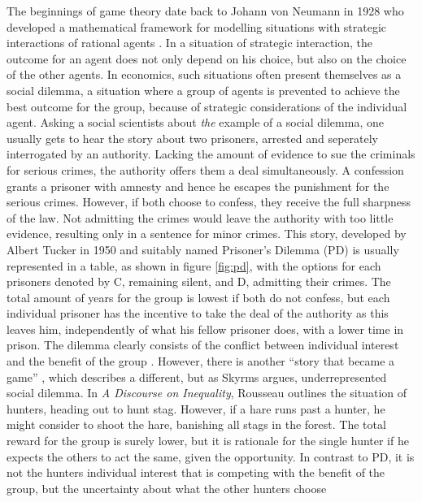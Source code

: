 %
%
%
%

The beginnings of game theory date back to Johann von Neumann in 1928 
who developed a mathematical framework
for modelling situations with strategic interactions of rational agents 
\parencite{v._neumann_zur_1928}.
In a situation of strategic interaction, the outcome for an agent does not
only depend on his choice, but also on the choice of the other agents.
In economics, such situations often present themselves as a social dilemma,
a situation where a group of agents is prevented to achieve the best
outcome for the group, because of strategic considerations of the individual
agent.
Asking a social scientists about \textit{the} example of a social dilemma, 
one usually gets to hear the story about two prisoners, arrested and 
seperately interrogated by an authority. Lacking the amount of evidence to sue 
the criminals for serious crimes, the authority offers them a deal 
simultaneously.
A confession grants a prisoner with amnesty and hence he escapes the punishment
for the serious crimes. However, if both choose to confess, they receive the
full sharpness of the law. Not admitting the crimes would leave the authority
with too little evidence, resulting only in a sentence for minor crimes.
This story, developed by Albert Tucker in 1950 and suitably named Prisoner's
Dilemma (PD) is usually represented in a table, as shown in figure \ref{fig:pd}, with
the options for each prisoners denoted by C, remaining silent, and D, admitting
their crimes. 
The total amount of years for the group is lowest if both do not confess, 
but each individual prisoner has the 
incentive to take the deal of the authority as this leaves him, independently
of what his fellow prisoner does, with a lower time in prison. The dilemma 
clearly consists of the conflict between individual interest and 
the benefit of the group \parencite{skyrms_stag_2004}. However, there is 
another ``story that became a game'' \parencite[1]{skyrms_stag_2004}, 
which describes a different, but as Skyrms argues, 
underrepresented social dilemma. In \textit{A Discourse on Inequality}, 
Rousseau outlines the situation of hunters, heading out to hunt 
stag. However, if a hare runs past a hunter, he might consider to
shoot the hare, banishing all stags in the forest. The total reward for
the group is surely lower, but it is rationale for the single hunter if he
expects the others to act the same, given the opportunity. In contrast
to PD, it is not the hunters individual interest that is competing with the
benefit of the group, but the uncertainty about what the other hunters choose
